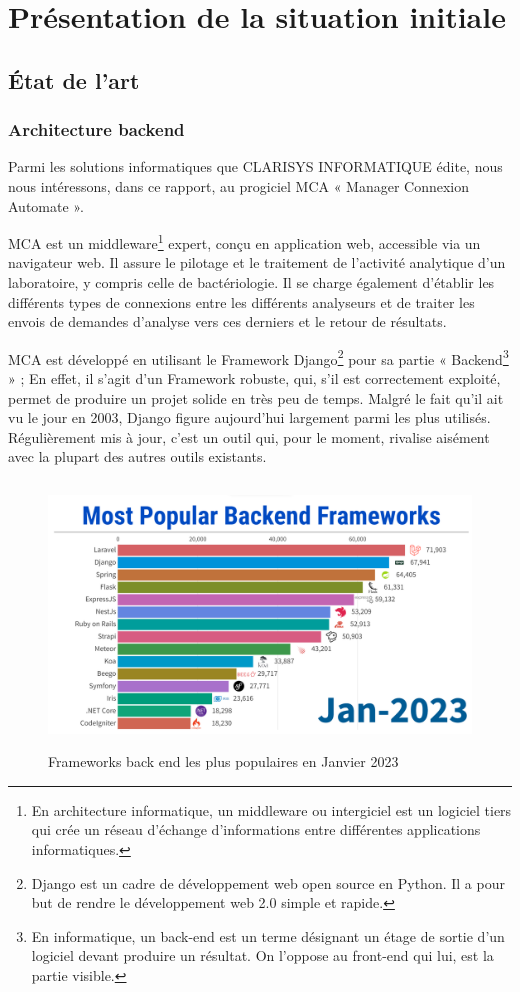 \section{Présentation de la situation initiale}
\subsection{État de l'art}
\subsubsection{Architecture backend}
Parmi les solutions informatiques que CLARISYS INFORMATIQUE édite, nous nous intéressons, 
dans ce rapport, au progiciel MCA « Manager Connexion Automate ».

MCA est un middleware\footnote[2]{En architecture informatique, un middleware ou intergiciel est 
un logiciel tiers qui crée un réseau d'échange d'informations entre différentes applications informatiques.}
expert, conçu en application web, accessible via un navigateur web. 
Il assure le pilotage et le traitement de l'activité analytique d'un laboratoire, y compris 
celle de bactériologie. Il se charge également d’établir les différents types de connexions 
entre les différents analyseurs et de traiter les envois de demandes d’analyse vers ces derniers 
et le retour de résultats.

MCA est développé en utilisant le Framework Django\footnote[3]{Django est un cadre de 
développement web open source en Python. Il a pour but de rendre le développement web 2.0 simple et rapide.}
pour sa partie « Backend\footnote[4]{En informatique, un back-end est un terme désignant un étage de sortie 
d'un logiciel devant produire un résultat. On l'oppose au front-end qui lui, est la partie visible.} » ; 
En effet, il s’agit d’un Framework robuste, qui, s’il est correctement exploité, 
permet de produire un projet solide en très peu de temps. Malgré le fait qu’il ait 
vu le jour en 2003, Django figure aujourd’hui largement parmi les plus utilisés. 
Régulièrement mis à jour, c’est un outil qui, pour le moment, rivalise aisément avec 
la plupart des autres outils existants.
\begin{figure}[hp]
    \centering
    \includegraphics[width=400pt,height=200pt]{images/frameworks_2023.png}
    \caption{Frameworks back end les plus populaires en Janvier 2023}
\end{figure}
\pagebreak

